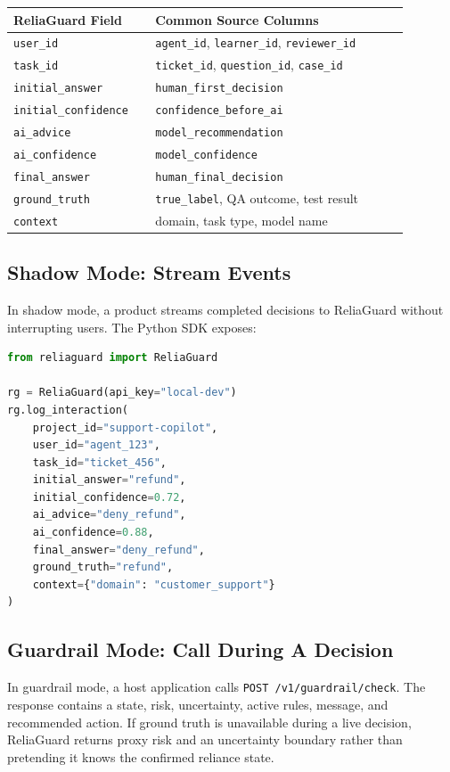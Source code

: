 \documentclass[11pt]{article}
\newcommand{\codepath}[1]{\nolinkurl{#1}}
\begin{document}
\begin{longtable}{p{0.30\linewidth} p{0.58\linewidth}}
\toprule
\textbf{ReliaGuard Field} & \textbf{Common Source Columns} \\
\midrule
\codepath{user\_id} & \codepath{agent\_id}, \codepath{learner\_id}, \codepath{reviewer\_id} \\
\codepath{task\_id} & \codepath{ticket\_id}, \codepath{question\_id}, \codepath{case\_id} \\
\codepath{initial\_answer} & \codepath{human\_first\_decision} \\
\codepath{initial\_confidence} & \codepath{confidence\_before\_ai} \\
\codepath{ai\_advice} & \codepath{model\_recommendation} \\
\codepath{ai\_confidence} & \codepath{model\_confidence} \\
\codepath{final\_answer} & \codepath{human\_final\_decision} \\
\codepath{ground\_truth} & \codepath{true\_label}, QA outcome, test result \\
\codepath{context} & domain, task type, model name \\
\bottomrule
\end{longtable}

\subsection{Shadow Mode: Stream Events}

In shadow mode, a product streams completed decisions to ReliaGuard without interrupting users. The Python SDK exposes:

\begin{lstlisting}[language=Python]
from reliaguard import ReliaGuard

rg = ReliaGuard(api_key="local-dev")
rg.log_interaction(
    project_id="support-copilot",
    user_id="agent_123",
    task_id="ticket_456",
    initial_answer="refund",
    initial_confidence=0.72,
    ai_advice="deny_refund",
    ai_confidence=0.88,
    final_answer="deny_refund",
    ground_truth="refund",
    context={"domain": "customer_support"}
)
\end{lstlisting}

\subsection{Guardrail Mode: Call During A Decision}

In guardrail mode, a host application calls \codepath{POST /v1/guardrail/check}. The response contains a state, risk, uncertainty, active rules, message, and recommended action. If ground truth is unavailable during a live decision, ReliaGuard returns proxy risk and an uncertainty boundary rather than pretending it knows the confirmed reliance state.
\end{document}
